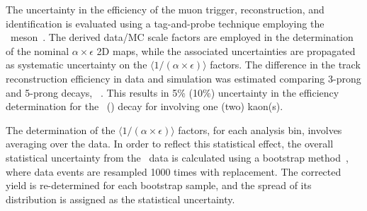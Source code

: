 The uncertainty in the efficiency of the muon trigger, reconstruction, and identification is evaluated using a tag-and-probe technique employing the \PJGy\ meson~\cite{Khachatryan:2010zg}. The derived data/MC scale factors are employed in the determination of the nominal $\alpha\!\times\!\epsilon$ 2D maps, while the associated uncertainties are propagated as systematic uncertainty on the  $\langle 1 / (\alpha\!\times\!\epsilon)\rangle$ factors.
The difference in the track reconstruction efficiency in data and simulation was estimated comparing 3-prong and 5-prong \PDst decays, \dstardecay~\cite{Khachatryan:2016odn}. 
 This results in 5\%  (10\%) uncertainty in the efficiency determination for the \PBp\  (\PBzs) decay for involving one (two) kaon(s).

The determination of the $\langle 1 / (\alpha\!\times\!\epsilon)\rangle$ factors, for each analysis bin, involves averaging over the data. In order to reflect this statistical effect, the overall statistical uncertainty from the \PbPb\ data is calculated using a bootstrap method~\cite{bootstrap}, where data events are resampled 1000 times with replacement. The corrected yield is re-determined for each bootstrap sample, and the spread of its distribution is assigned as the statistical uncertainty.   



